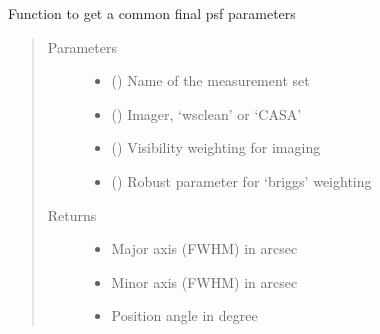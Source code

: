 \documentclass[letterpaper,10pt,english]{sphinxmanual}
\begin{document}
\begin{fulllineitems}
\label{\detokenize{paircars:paircars.basic_func.get_final_psf}}
\sphinxAtStartPar
Function to get a common final psf parameters
\begin{quote}\begin{description}
\item[{Parameters}] \leavevmode\begin{itemize}
\item {} 
\sphinxAtStartPar
{} () \textendash{} Name of the measurement set

\item {} 
\sphinxAtStartPar
{} () \textendash{} Imager, ‘wsclean’ or ‘CASA’

\item {} 
\sphinxAtStartPar
{} () \textendash{} Visibility weighting for imaging

\item {} 
\sphinxAtStartPar
{} () \textendash{} Robust parameter for ‘briggs’ weighting

\end{itemize}

\item[{Returns}] \leavevmode
\sphinxAtStartPar
\begin{itemize}
\item {} 
\sphinxAtStartPar
{} \textendash{} Major axis (FWHM) in arcsec

\item {} 
\sphinxAtStartPar
{} \textendash{} Minor axis (FWHM) in arcsec

\item {} 
\sphinxAtStartPar
{} \textendash{} Position angle in degree

\end{itemize}


\end{description}\end{quote}

\end{fulllineitems}
\end{document}
